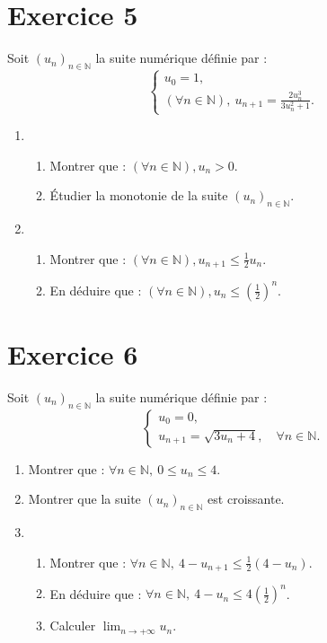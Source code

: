 \documentclass[a4paper,11pt]{article}
\begin{document}
\section*{Exercice 5}

Soit \((u_n)_{n \in \mathbb{N}}\) la suite numérique définie par :
\[
\begin{cases}
u_0 = 1, \\
(\forall n \in \mathbb{N}), \ u_{n+1} = \frac{2u_n^3}{3u_n^2 + 1}.
\end{cases}
\]

\begin{enumerate}
    \item 
    \begin{enumerate}
        \item Montrer que : \((\forall n \in \mathbb{N}), u_n > 0\).
        \item Étudier la monotonie de la suite \((u_n)_{n \in \mathbb{N}}\).
    \end{enumerate}

    \item 
    \begin{enumerate}
        \item Montrer que : \((\forall n \in \mathbb{N}), u_{n+1} \leq \frac{1}{2} u_n\).
        \item En déduire que : \((\forall n \in \mathbb{N}), u_n \leq \left(\frac{1}{2}\right)^n\).
    \end{enumerate}
\end{enumerate}

\section*{Exercice 6}

Soit \((u_n)_{n \in \mathbb{N}}\) la suite numérique définie par :
\[
\begin{cases}
u_0 = 0, \\
u_{n+1} = \sqrt{3u_n + 4}, \quad \forall n \in \mathbb{N}.
\end{cases}
\]

\begin{enumerate}
    \item Montrer que : \(\forall n \in \mathbb{N}, \ 0 \leq u_n \leq 4\).

    \item Montrer que la suite \((u_n)_{n \in \mathbb{N}}\) est croissante.

    \item 
    \begin{enumerate}
        \item Montrer que : \(\forall n \in \mathbb{N}, \ 4 - u_{n+1} \leq \frac{1}{2}(4 - u_n)\).
        \item En déduire que : \(\forall n \in \mathbb{N}, \ 4 - u_n \leq 4 \left(\frac{1}{2}\right)^n\).
        \item Calculer \(\lim_{n \to +\infty} u_n\).
    \end{enumerate}
\end{enumerate}
\end{document}
